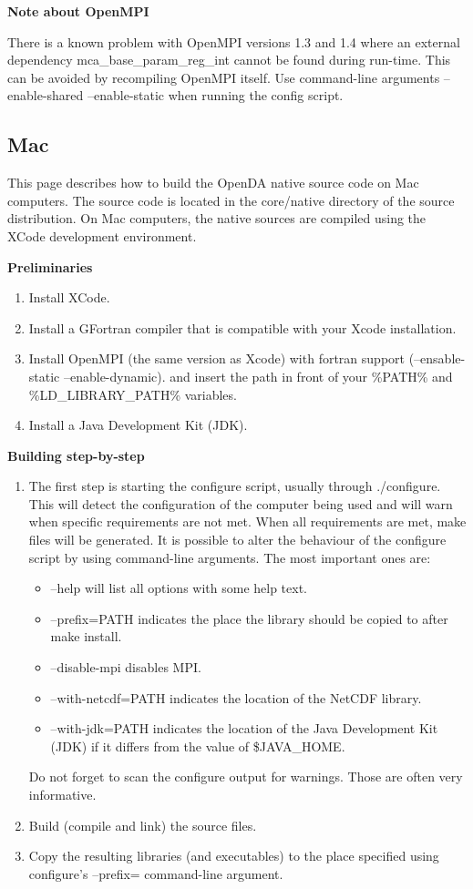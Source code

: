 \textbf{Note about OpenMPI}

There is a known problem with OpenMPI versions 1.3 and 1.4 where an external dependency mca\_base\_param\_reg\_int cannot be found during run-time. This can be avoided by recompiling OpenMPI itself. Use command-line arguments --enable-shared --enable-static when running the config script. 

\subsection{Mac}

This page describes how to build the OpenDA native source code on Mac computers. The source code is located in the core/native directory of the source distribution. On Mac computers, the native sources are compiled using the XCode development environment. 

\textbf{Preliminaries}

\begin{enumerate}
	\item Install XCode.
	\item Install a GFortran compiler that is compatible with your Xcode installation.
	\item Install OpenMPI (the same version as Xcode) with fortran support (--ensable-static --enable-dynamic). and insert the path in front of your \%PATH\% and \%LD\_LIBRARY\_PATH\% variables.
	\item Install a Java Development Kit (JDK).
\end{enumerate}

\textbf{Building step-by-step}

\begin{enumerate}
	\item The first step is starting the configure script, usually through ./configure. This will detect the configuration of the computer being used and will warn when specific requirements are not met. When all requirements are met, make files will be generated. It is possible to alter the behaviour of the configure script by using command-line arguments. The most important ones are: 
	\begin{itemize}
		\item --help will list all options with some help text.
		\item --prefix=PATH indicates the place the library should be copied to after make install.
		\item --disable-mpi disables MPI.
		\item --with-netcdf=PATH indicates the location of the NetCDF library.
		\item --with-jdk=PATH indicates the location of the Java Development Kit (JDK) if it differs from the value of \$JAVA\_HOME.
	\end{itemize}
	Do not forget to scan the configure output for warnings. Those are often very informative. 
	\item Build (compile and link) the source files.
	\item Copy the resulting libraries (and executables) to the place specified using configure's --prefix= command-line argument. 
\end{enumerate}

